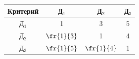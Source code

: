 \begin{table}
\begin{minipage}[b]{64mm}
\begin{center}






      \vspace*{2ex}

      

      \tabcolsep=12.5pt

      \begin{tabular}{|c|c|c|c|}

      \hline

Критерий&Д$_1$&Д$_2$&Д$_3$\\

\hline

Д$_1$&1&3&5\\

Д$_2$&$\fr{1}{3}$&1&4\\

Д$_3$&$\fr{1}{5}$&$\fr{1}{4}$&1\\

\hline

      \end{tabular}

      \end{center}

      \end{minipage}

      \end{table}



     

